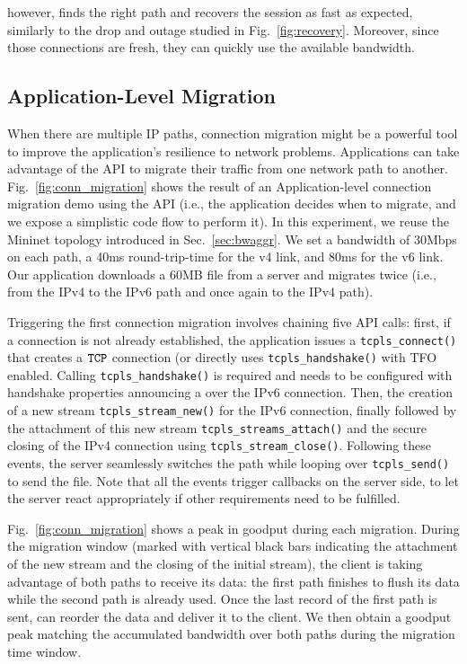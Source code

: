 \tcpls however, finds the right path and recovers the session as fast as
expected, similarly to the drop and \rst outage studied in Fig.~\ref{fig:recovery}. Moreover, since those connections are fresh, they can quickly use the available bandwidth.

\subsection{Application-Level Migration}
\label{sec:app-migration}

When there are multiple IP paths, connection migration might be a
powerful tool to improve the application's resilience to network problems. Applications can take advantage of the \tcpls API to migrate their traffic from one network path to another. Fig.~\ref{fig:conn_migration} shows the result of an Application-level connection migration demo using the API (i.e., the application decides when to migrate, and we expose a simplistic code flow to perform it). In this experiment, we reuse the Mininet topology introduced in Sec.~\ref{sec:bwaggr}. We set a bandwidth of 30Mbps on each path, a 40ms round-trip-time for the v4 link, and 80ms for the v6 link. Our application downloads
a 60MB file from a server and migrates twice (i.e., from the IPv4 to the IPv6 path and once again to the IPv4 path).

Triggering the first connection migration involves chaining five API calls: first, if a \tcp connection is not already established, the application issues a
\texttt{tcpls\_connect()} that creates a $\texttt{TCP}$ connection (or directly uses
\texttt{tcpls\_handshake()} with TFO enabled. Calling \texttt{tcpls\_handshake()} is required and needs to be configured with handshake properties announcing a \join over the IPv6 connection. Then, the creation of a new stream \texttt{tcpls\_stream\_new()} for the IPv6 connection, finally followed by the attachment of this new stream \texttt{tcpls\_streams\_attach()} and the secure closing of the IPv4 \tcp connection using \texttt{tcpls\_stream\_close()}. Following these events, the server seamlessly switches the path while looping over \texttt{tcpls\_send()} to send the file. Note that all the events trigger callbacks on the server side, to let the server react appropriately if other requirements need to be fulfilled.

Fig.~\ref{fig:conn_migration} shows a peak in goodput during each migration. During the migration window (marked with vertical black bars indicating the attachment of the new stream and the closing of the initial stream), the client is taking advantage of both paths to receive its data: the first path finishes to flush its data while the second path is already used. Once the last record of the first path is sent, \tcpls can reorder the data and deliver it to the client. We then obtain a goodput peak matching the accumulated bandwidth over both paths during the migration time window.

